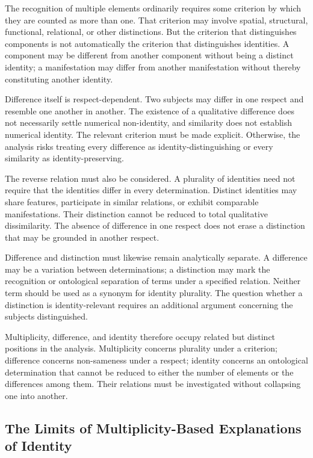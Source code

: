 The recognition of multiple elements ordinarily
requires some criterion by which they are
counted as more than one. That criterion may
involve spatial, structural, functional,
relational, or other distinctions. But the
criterion that distinguishes components is
not automatically the criterion that distinguishes
identities. A component may be different from
another component without being a distinct
identity; a manifestation may differ from
another manifestation without thereby
constituting another identity.

Difference itself is respect-dependent.
Two subjects may differ in one respect and
resemble one another in another. The existence
of a qualitative difference does not necessarily
settle numerical non-identity, and similarity
does not establish numerical identity. The
relevant criterion must be made explicit.
Otherwise, the analysis risks treating every
difference as identity-distinguishing or
every similarity as identity-preserving.

The reverse relation must also be considered.
A plurality of identities need not require
that the identities differ in every determination.
Distinct identities may share features,
participate in similar relations, or exhibit
comparable manifestations. Their distinction
cannot be reduced to total qualitative
dissimilarity. The absence of difference in
one respect does not erase a distinction
that may be grounded in another respect.

Difference and distinction must likewise
remain analytically separate. A difference
may be a variation between determinations;
a distinction may mark the recognition or
ontological separation of terms under a
specified relation. Neither term should be
used as a synonym for identity plurality.
The question whether a distinction is
identity-relevant requires an additional
argument concerning the subjects distinguished.

Multiplicity, difference, and identity
therefore occupy related but distinct
positions in the analysis. Multiplicity
concerns plurality under a criterion;
difference concerns non-sameness under
a respect; identity concerns an ontological
determination that cannot be reduced to
either the number of elements or the
differences among them. Their relations
must be investigated without collapsing
one into another.

\subsection{The Limits of Multiplicity-Based Explanations of Identity}

